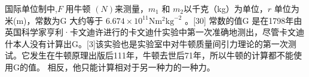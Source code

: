 国际单位制中,$F$ 用牛顿 $(N)$来测量，$m_1$ 和 $m_2$以千克（kg）为单位，$r$ 单位为米(m)，常数为G 大约等于 $ 6.674 \times 10^{11}  \text{N} \text{m}^2 \text{kg}^{-2}$ 。[30] 常数的值G 是在1798年由英国科学家亨利·卡文迪许进行的卡文迪什实验中第一次准确地测出，尽管卡文迪什本人没有计算出G。[3]该实验也是实验室中对牛顿质量间引力理论的第一次测试。它发生在牛顿原理出版后111年，牛顿去世后71年，所以牛顿的计算都不能使用G的值。 相反，他只能计算相对于另一种力的一种力。

